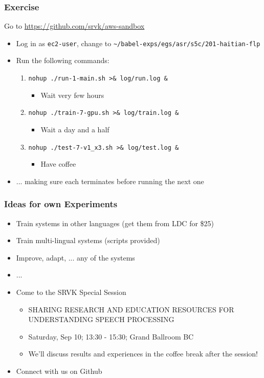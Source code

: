 \begin{frame}
  \frametitle{Exercise}{Go to \url{https://github.com/srvk/aws-sandbox}}
  \begin{itemize}
  \item Log in as \texttt{ec2-user}, change to \texttt{\textasciitilde/babel-exps/egs/asr/s5c/201-haitian-flp}
  \item Run the following commands:
    \begin{enumerate}
    \item \texttt{nohup ./run-1-main.sh    >\& log/run.log \&}
      \begin{itemize}
      \item Wait very few hours
      \end{itemize}
    \item \texttt{nohup ./train-7-gpu.sh   >\& log/train.log \&}
      \begin{itemize}
      \item Wait a day and a half
      \end{itemize}
    \item \texttt{nohup ./test-7-v1\_x3.sh >\& log/test.log \&}
      \begin{itemize}
      \item Have coffee
      \end{itemize}
    \end{enumerate}
  \item ... making sure each terminates before running the next one
  \end{itemize}
\end{frame}

\begin{frame}
  \frametitle{Ideas for own Experiments}
  \begin{itemize}
  \item Train systems in other languages (get them from LDC for \$25)
  \item Train multi-lingual systems (scripts provided)
  \item Improve, adapt, ... any of the systems
  \item ...
  \item Come to the SRVK Special Session
    \begin{itemize}
    \item SHARING RESEARCH AND EDUCATION RESOURCES FOR UNDERSTANDING SPEECH PROCESSING
    \item Saturday, Sep 10; 13:30 - 15:30; Grand Ballroom BC
    \item We'll discuss results and experiences in the coffee break after the session!
    \end{itemize}
  \item Connect with us on Github
  \end{itemize}
\end{frame}


